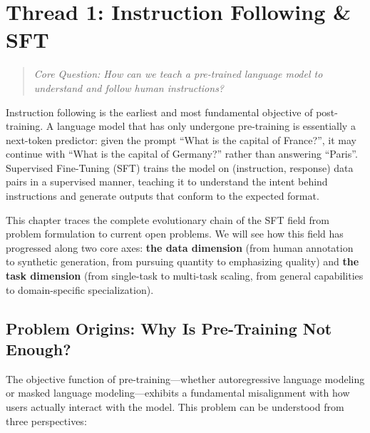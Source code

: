 \section{Thread 1: Instruction Following \& SFT}
\label{sec:t1}

\begin{quote}
\textit{Core Question: How can we teach a pre-trained language model to understand and follow human instructions?}
\end{quote}

Instruction following is the earliest and most fundamental objective of post-training.
A language model that has only undergone pre-training is essentially a next-token predictor:
given the prompt ``What is the capital of France?'', it may continue with ``What is the capital of Germany?''
rather than answering ``Paris''.
Supervised Fine-Tuning (SFT) trains the model on (instruction, response) data pairs in a supervised manner,
teaching it to understand the intent behind instructions and generate outputs that conform to the expected format.

This chapter traces the complete evolutionary chain of the SFT field from problem formulation to current open problems.
We will see how this field has progressed along two core axes:
\textbf{the data dimension} (from human annotation to synthetic generation, from pursuing quantity to emphasizing quality)
and \textbf{the task dimension} (from single-task to multi-task scaling, from general capabilities to domain-specific specialization).



\subsection{Problem Origins: Why Is Pre-Training Not Enough?}
\label{sec:t1-origin}

The objective function of pre-training---whether autoregressive language modeling or masked language modeling---exhibits
a fundamental misalignment with how users actually interact with the model.
This problem can be understood from three perspectives:

